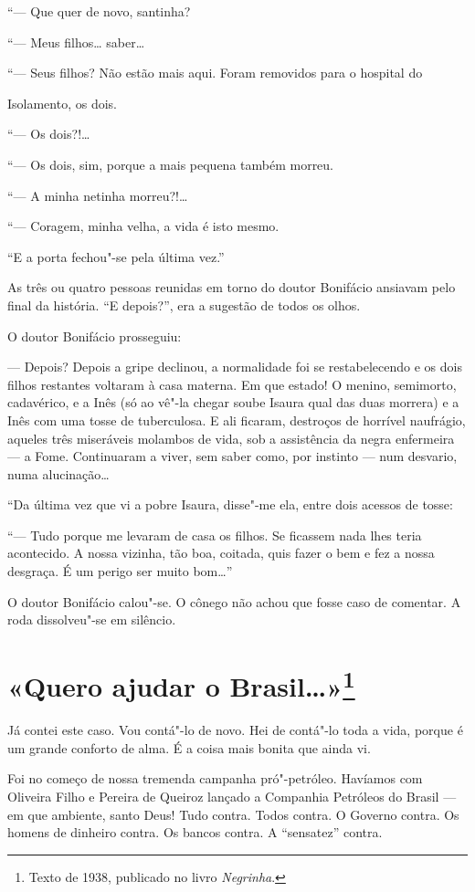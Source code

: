 ``--- Que quer de novo, santinha?

``--- Meus filhos\ldots{} saber\ldots{}

``--- Seus filhos? Não estão mais aqui. Foram removidos para o hospital
do

Isolamento, os dois.

``--- Os dois?!\ldots{}

``--- Os dois, sim, porque a mais pequena também morreu.

``--- A minha netinha morreu?!\ldots{}

``--- Coragem, minha velha, a vida é isto mesmo.

``E a porta fechou"-se pela última vez.''

As três ou quatro pessoas reunidas em torno do doutor Bonifácio ansiavam
pelo final da história. ``E depois?'', era a sugestão de todos os olhos.

O doutor Bonifácio prosseguiu:

--- Depois? Depois a gripe declinou, a normalidade foi se restabelecendo
e os dois filhos restantes voltaram à casa materna. Em que estado! O
menino, semimorto, cadavérico, e a Inês (só ao vê"-la chegar soube Isaura
qual das duas morrera) e a Inês com uma tosse de tuberculosa. E ali
ficaram, destroços de horrível naufrágio, aqueles três miseráveis
molambos de vida, sob a assistência da negra enfermeira --- a Fome.
Continuaram a viver, sem saber como, por instinto --- num desvario, numa
alucinação\ldots{}

``Da última vez que vi a pobre Isaura, disse"-me ela, entre dois acessos
de tosse:

``--- Tudo porque me levaram de casa os filhos. Se ficassem nada lhes
teria acontecido. A nossa vizinha, tão boa, coitada, quis fazer o bem e
fez a nossa desgraça. É um perigo ser muito bom\ldots{}''

O doutor Bonifácio calou"-se. O cônego não achou que fosse caso de
comentar. A roda dissolveu"-se em silêncio.

\chapter{«Quero ajudar o Brasil\ldots{}»\footnote[*]{Texto de 1938, publicado no livro \emph{Negrinha}.}}

Já contei este caso. Vou contá"-lo de novo. Hei de contá"-lo toda a vida,
porque é um grande conforto de alma. É a coisa mais bonita que ainda vi.

Foi no começo de nossa tremenda campanha pró"-petróleo. Havíamos com
Oliveira Filho e Pereira de Queiroz lançado a Companhia Petróleos do
Brasil --- em que ambiente, santo Deus! Tudo contra. Todos contra. O
Governo contra. Os homens de dinheiro contra. Os bancos contra. A
``sensatez'' contra.

